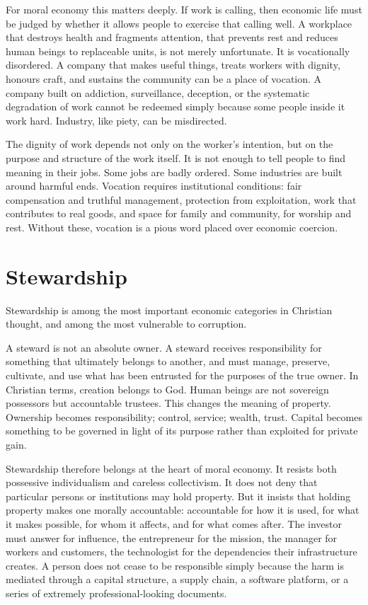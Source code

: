 \documentclass[11pt,a4paper,oneside]{book}
\begin{document}
For moral economy this matters deeply. If work is calling, then economic life must be judged by whether it allows people to exercise that calling well. A workplace that destroys health and fragments attention, that prevents rest and reduces human beings to replaceable units, is not merely unfortunate. It is vocationally disordered. A company that makes useful things, treats workers with dignity, honours craft, and sustains the community can be a place of vocation. A company built on addiction, surveillance, deception, or the systematic degradation of work cannot be redeemed simply because some people inside it work hard. Industry, like piety, can be misdirected.

The dignity of work depends not only on the worker's intention, but on the purpose and structure of the work itself. It is not enough to tell people to find meaning in their jobs. Some jobs are badly ordered. Some industries are built around harmful ends. Vocation requires institutional conditions: fair compensation and truthful management, protection from exploitation, work that contributes to real goods, and space for family and community, for worship and rest. Without these, vocation is a pious word placed over economic coercion.

\section*{Stewardship}

Stewardship is among the most important economic categories in Christian thought, and among the most vulnerable to corruption.

A steward is not an absolute owner. A steward receives responsibility for something that ultimately belongs to another, and must manage, preserve, cultivate, and use what has been entrusted for the purposes of the true owner. In Christian terms, creation belongs to God. Human beings are not sovereign possessors but accountable trustees. This changes the meaning of property. Ownership becomes responsibility; control, service; wealth, trust. Capital becomes something to be governed in light of its purpose rather than exploited for private gain.

Stewardship therefore belongs at the heart of moral economy. It resists both possessive individualism and careless collectivism. It does not deny that particular persons or institutions may hold property. But it insists that holding property makes one morally accountable: accountable for how it is used, for what it makes possible, for whom it affects, and for what comes after. The investor must answer for influence, the entrepreneur for the mission, the manager for workers and customers, the technologist for the dependencies their infrastructure creates. A person does not cease to be responsible simply because the harm is mediated through a capital structure, a supply chain, a software platform, or a series of extremely professional-looking documents.
\end{document}
